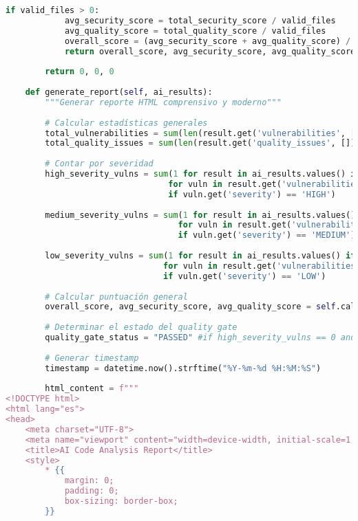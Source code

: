 \begin{lstlisting}[language=python, caption={Contenido completo del script ai\_analyzer.py.}, label={lst:python_script}]
        if valid_files > 0:
            avg_security_score = total_security_score / valid_files
            avg_quality_score = total_quality_score / valid_files
            overall_score = (avg_security_score + avg_quality_score) / 2
            return overall_score, avg_security_score, avg_quality_score
        
        return 0, 0, 0
    
    def generate_report(self, ai_results):
        """Generar reporte HTML comprensivo y moderno"""
        
        # Calcular estadísticas generales
        total_vulnerabilities = sum(len(result.get('vulnerabilities', [])) for result in ai_results.values() if isinstance(result, dict))
        total_quality_issues = sum(len(result.get('quality_issues', [])) for result in ai_results.values() if isinstance(result, dict))
        
        # Contar por severidad
        high_severity_vulns = sum(1 for result in ai_results.values() if isinstance(result, dict) 
                                 for vuln in result.get('vulnerabilities', []) 
                                 if vuln.get('severity') == 'HIGH')
        
        medium_severity_vulns = sum(1 for result in ai_results.values() if isinstance(result, dict) 
                                   for vuln in result.get('vulnerabilities', []) 
                                   if vuln.get('severity') == 'MEDIUM')
        
        low_severity_vulns = sum(1 for result in ai_results.values() if isinstance(result, dict) 
                                for vuln in result.get('vulnerabilities', []) 
                                if vuln.get('severity') == 'LOW')
        
        # Calcular puntuación general
        overall_score, avg_security_score, avg_quality_score = self.calculate_overall_score(ai_results)
        
        # Determinar el estado del quality gate
        quality_gate_status = "PASSED" #if high_severity_vulns == 0 and overall_score >= 7 else "FAILED"
        
        # Generar timestamp
        timestamp = datetime.now().strftime("%Y-%m-%d %H:%M:%S")
        
        html_content = f"""
<!DOCTYPE html>
<html lang="es">
<head>
    <meta charset="UTF-8">
    <meta name="viewport" content="width=device-width, initial-scale=1.0">
    <title>AI Code Analysis Report</title>
    <style>
        * {{
            margin: 0;
            padding: 0;
            box-sizing: border-box;
        }}
        

\end{lstlisting}
